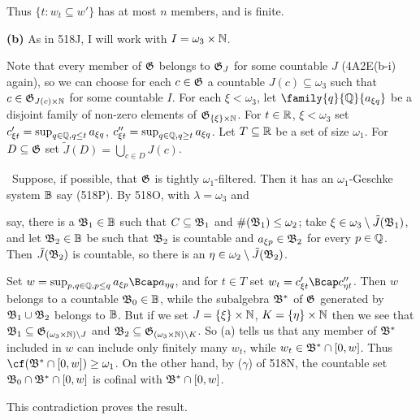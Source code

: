 {Thus $\{t:w_t\subseteq w'\}$ has at most $n$ members, and is finite.

\medskip

{\bf (b)} As in 518J, I will work with $I=\omega_3\times\Bbb N$.

\medskip

 Note that every member of $\frak G$
belongs to $\frak G_J$ for some countable $J$ (4A2E(b-i) again), so we can
choose for each $c\in\frak G$ a countable $J(c)\subseteq\omega_3$ such
that $c\in\frak G_{J(c)\times\Bbb N}$ for some countable $I$.   For each
$\xi<\omega_3$, let $\family{q}{\Bbb Q}{a_{\xi q}}$ be a disjoint family
of non-zero elements of $\frak G_{\{\xi\}\times\Bbb N}$.   For
$t\in\Bbb R$, $\xi<\omega_3$ set
$c'_{\xi t}=\sup_{q\in\Bbb Q,q\le t}a_{\xi q}$,
$c''_{\xi t}=\sup_{q\in\Bbb Q,q\ge t}a_{\xi q}$.
Let $T\subseteq\Bbb R$ be a set of size $\omega_1$.   For
$D\subseteq\frak G$ set $\tilde J(D)=\bigcup_{c\in D}J(c)$.

\medskip

 \Quer\ Suppose, if possible, that $\frak G$ is tightly
$\omega_1$-filtered.   Then it has an $\omega_1$-Geschke system $\Bbb B$
say (518P).   By 518O, with $\lambda=\omega_3$ and


\noindent say, there is a $\frak B_1\in\Bbb B$ such that
$C\subseteq\frak B_1$ and $\#(\frak B_1)\le\omega_2$;
take $\xi\in\omega_3\setminus\tilde J(\frak B_1)$, and let
$\frak B_2\in\Bbb B$ be such that $\frak B_2$ is countable and
$a_{\xi p}\in\frak B_2$ for every $p\in\Bbb Q$.
Then $\tilde J(\frak B_2)$ is countable,
so there is an $\eta\in\omega_2\setminus\tilde J(\frak B_2)$.

Set $w=\sup_{p,q\in\Bbb Q,p\le q}a_{\xi p}\Bcap a_{\eta q}$, and for
$t\in T$ set
$w_t=c'_{\xi t}\Bcap c''_{\eta t}$.   Then $w$
belongs to a countable $\frak B_0\in\Bbb B$, while the subalgebra
$\frak B^*$ of $\frak G$ generated by $\frak B_1\cup\frak B_2$ belongs
to $\Bbb B$.   But if we set $J=\{\xi\}\times\Bbb N$,
$K=\{\eta\}\times\Bbb N$ then we see that
$\frak B_1\subseteq\frak G_{(\omega_3\times\Bbb N)\setminus J}$ and
$\frak B_2\subseteq\frak G_{(\omega_3\times\Bbb N)\setminus K}$.   So
(a) tells us that any member of $\frak B^*$ included in $w$ can include
only finitely many $w_t$, while $w_t\in\frak B^*\cap[0,w]$.   Thus
$\cf(\frak B^*\cap[0,w])\ge\omega_1$.   On the other hand,
by ($\gamma$) of 518N, the countable set
$\frak B_0\cap\frak B^*\cap[0,w]$ is cofinal with $\frak B^*\cap[0,w]$.\
\Bang

This contradiction proves the result.
}%

